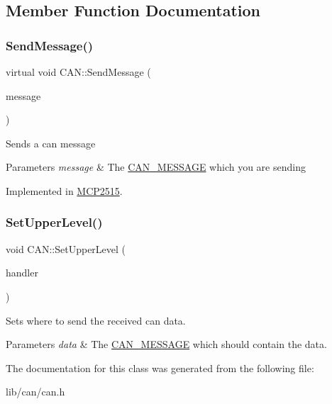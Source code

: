 \subsection{Member Function Documentation}
\hypertarget{class_c_a_n_a9149d0118ae9de4a8dc0b807f7c34b1a}{}\label{class_c_a_n_a9149d0118ae9de4a8dc0b807f7c34b1a} 
\subsubsection{\texorpdfstring{Send\+Message()}{SendMessage()}}
{\footnotesize\ttfamily virtual void C\+A\+N\+::\+Send\+Message (\begin{DoxyParamCaption}\item[{\hyperlink{struct_c_a_n___m_e_s_s_a_g_e}{C\+A\+N\+\_\+\+M\+E\+S\+S\+A\+GE} \&}]{message }\end{DoxyParamCaption})\hspace{0.3cm}{\ttfamily [pure virtual]}}

Sends a can message 
\begin{DoxyParams}{Parameters}
{\em message} & The \hyperlink{struct_c_a_n___m_e_s_s_a_g_e}{C\+A\+N\+\_\+\+M\+E\+S\+S\+A\+GE} which you are sending \\
\hline
\end{DoxyParams}


Implemented in \hyperlink{class_m_c_p2515_aa8c9fe944f7e6e99feb3f56a1c099a29}{M\+C\+P2515}.

\hypertarget{class_c_a_n_ac68e0152514d39c43e9406b19031af89}{}\label{class_c_a_n_ac68e0152514d39c43e9406b19031af89} 
\subsubsection{\texorpdfstring{Set\+Upper\+Level()}{SetUpperLevel()}}
{\footnotesize\ttfamily void C\+A\+N\+::\+Set\+Upper\+Level (\begin{DoxyParamCaption}\item[{void($\ast$)(\hyperlink{struct_c_a_n___m_e_s_s_a_g_e}{C\+A\+N\+\_\+\+M\+E\+S\+S\+A\+GE} \&data)}]{handler }\end{DoxyParamCaption})\hspace{0.3cm}{\ttfamily [inline]}}

Sets where to send the received can data. 
\begin{DoxyParams}{Parameters}
{\em data} & The \hyperlink{struct_c_a_n___m_e_s_s_a_g_e}{C\+A\+N\+\_\+\+M\+E\+S\+S\+A\+GE} which should contain the data. \\
\hline
\end{DoxyParams}


The documentation for this class was generated from the following file\+:\begin{DoxyCompactItemize}
\item 
lib/can/can.\+h\end{DoxyCompactItemize}
